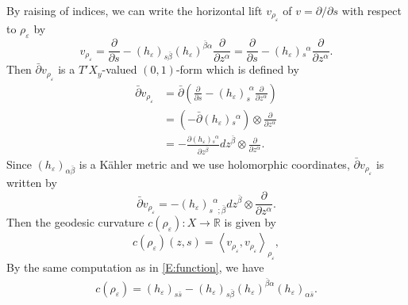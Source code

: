 \documentclass{amsart}
\theoremstyle{definition}
\numberwithin{equation}{section}
\begin{document}
By raising of indices, we can write the horizontal lift $v_{\rho_\varepsilon}$ of $v=\partial/\partial s$ with respect to $\rho_\varepsilon$ by
\begin{equation*}
v_{\rho_\varepsilon}
=
{\frac{\partial{}}{\partial{s}}}
-(h_{\varepsilon})_{s\bar\beta}(h_{\varepsilon})^{\bar\beta\alpha}{\frac{\partial{}}{\partial{z^\alpha}}}
=
{\frac{\partial{}}{\partial{s}}}
-(h_{\varepsilon}){_{{s}\phantom{{\alpha}}{}}^{\phantom{{s}}{\alpha}}}{\frac{\partial{}}{\partial{z^\alpha}}}.
\end{equation*}
Then $\bar\partial{v_{\rho_\varepsilon}}$ is a $T'X_y$-valued $(0,1)$-form which is defined by
\begin{align*}
\bar\partial{v_{\rho_\varepsilon}}
&=
\bar\partial{\left({{\frac{\partial{}}{\partial{s}}}
-(h_{\varepsilon})_{s}^{\phantom{i}\alpha}{\frac{\partial{}}{\partial{z^\alpha}}}}\right)} \\
&=
{\left({-\bar\partial{(h_{\varepsilon})}{_{{s}\phantom{{\alpha}}{}}^{\phantom{{s}}{\alpha}}}}\right)}\otimes{\frac{\partial{}}{\partial{z^\alpha}}} \\
&=
-{\frac{\partial{(h_{\varepsilon}){_{{s}\phantom{{\alpha}}{}}^{\phantom{{s}}{\alpha}}}}}{\partial{z^{\bar\beta}}}}dz^{\bar\beta}\otimes{\frac{\partial{}}{\partial{z^\alpha}}}.
\end{align*}
Since $(h_{\varepsilon})_{\alpha\bar\beta}$ is a K\"{a}hler metric and we use holomorphic coordinates, $\bar\partial v_{\rho_\varepsilon}$ is written by
\begin{equation*}
\bar\partial v_{\rho_\varepsilon}
=
-(h_{\varepsilon}){_{{s}\phantom{{\alpha}}{;\bar\beta}}^{\phantom{{s}}{\alpha}}}dz^{\bar\beta}\otimes{\frac{\partial{}}{\partial{z^\alpha}}}.
\end{equation*}
Then the geodesic curvature $c(\rho_{\varepsilon}):X\rightarrow{\mathbb{R}}$ is given by
\begin{equation*}
c(\rho_{\varepsilon})(z,s)={\left\langle{{v_{\rho_\varepsilon},v_{\rho_\varepsilon}}}\right\rangle}_{\rho_\varepsilon},
\end{equation*}
By the same computation as in \eqref{E:function}, we have
\begin{equation*}
\begin{aligned}
c(\rho_{\varepsilon})
=
(h_{\varepsilon})_{s\bar{s}}
-
(h_{\varepsilon})_{s\bar\beta}(h_{\varepsilon})^{\bar\beta\alpha}(h_{\varepsilon})_{\alpha\bar{s}}.
\end{aligned}
\end{equation*}
\end{document}
